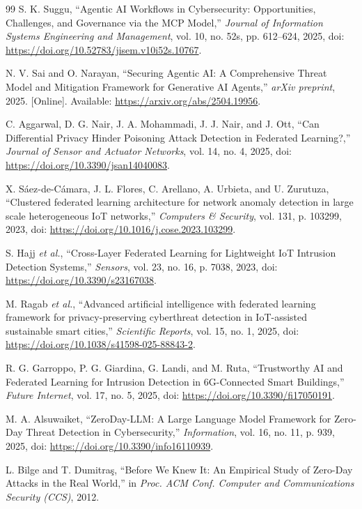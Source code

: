 \documentclass[conference]{IEEEtran}
\begin{document}
\begin{thebibliography}{99}
S. K. Suggu, ``Agentic AI Workflows in Cybersecurity: Opportunities, Challenges, and Governance via the MCP Model,'' \emph{Journal of Information Systems Engineering and Management}, vol. 10, no. 52s, pp. 612--624, 2025, doi: \url{https://doi.org/10.52783/jisem.v10i52s.10767}.

N. V. Sai and O. Narayan, ``Securing Agentic AI: A Comprehensive Threat Model and Mitigation Framework for Generative AI Agents,'' \emph{arXiv preprint}, 2025. [Online]. Available: \url{https://arxiv.org/abs/2504.19956}.

C. Aggarwal, D. G. Nair, J. A. Mohammadi, J. J. Nair, and J. Ott, ``Can Differential Privacy Hinder Poisoning Attack Detection in Federated Learning?,'' \emph{Journal of Sensor and Actuator Networks}, vol. 14, no. 4, 2025, doi: \url{https://doi.org/10.3390/jsan14040083}.

X. S\'aez-de-C\'amara, J. L. Flores, C. Arellano, A. Urbieta, and U. Zurutuza, ``Clustered federated learning architecture for network anomaly detection in large scale heterogeneous IoT networks,'' \emph{Computers \& Security}, vol. 131, p. 103299, 2023, doi: \url{https://doi.org/10.1016/j.cose.2023.103299}.

S. Hajj \emph{et al.}, ``Cross-Layer Federated Learning for Lightweight IoT Intrusion Detection Systems,'' \emph{Sensors}, vol. 23, no. 16, p. 7038, 2023, doi: \url{https://doi.org/10.3390/s23167038}.

M. Ragab \emph{et al.}, ``Advanced artificial intelligence with federated learning framework for privacy-preserving cyberthreat detection in IoT-assisted sustainable smart cities,'' \emph{Scientific Reports}, vol. 15, no. 1, 2025, doi: \url{https://doi.org/10.1038/s41598-025-88843-2}.

R. G. Garroppo, P. G. Giardina, G. Landi, and M. Ruta, ``Trustworthy AI and Federated Learning for Intrusion Detection in 6G-Connected Smart Buildings,'' \emph{Future Internet}, vol. 17, no. 5, 2025, doi: \url{https://doi.org/10.3390/fi17050191}.

M. A. Alsuwaiket, ``ZeroDay-LLM: A Large Language Model Framework for Zero-Day Threat Detection in Cybersecurity,'' \emph{Information}, vol. 16, no. 11, p. 939, 2025, doi: \url{https://doi.org/10.3390/info16110939}.

L. Bilge and T. Dumitra\c{s}, ``Before We Knew It: An Empirical Study of Zero-Day Attacks in the Real World,'' in \emph{Proc. ACM Conf. Computer and Communications Security (CCS)}, 2012.


\end{thebibliography}
\end{document}
